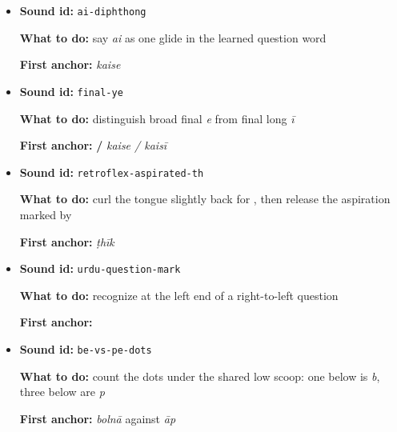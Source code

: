 \begin{itemize}
\begin{minipage}[t]{\linewidth}
  \par \textbf{First anchor:} \textbf{} \emph{kyā}
  \end{minipage}
  \item \begin{minipage}[t]{\linewidth}
  \textbf{Sound id:} \texttt{ai-diphthong}
  \par \textbf{What to do:} say \emph{ai} as one glide in the learned question word
  \par \textbf{First anchor:} \textbf{} \emph{kaise}
  \end{minipage}
  \item \begin{minipage}[t]{\linewidth}
  \textbf{Sound id:} \texttt{final-ye}
  \par \textbf{What to do:} distinguish broad final \textbf{} \emph{e} from final \textbf{} long \emph{ī}
  \par \textbf{First anchor:} \textbf{ / } \emph{kaise / kaisī}
  \end{minipage}
  \item \begin{minipage}[t]{\linewidth}
  \textbf{Sound id:} \texttt{retroflex-aspirated-th}
  \par \textbf{What to do:} curl the tongue slightly back for \textbf{}, then release the aspiration marked by \textbf{}
  \par \textbf{First anchor:} \textbf{} \emph{ṭhīk}
  \end{minipage}
  \item \begin{minipage}[t]{\linewidth}
  \textbf{Sound id:} \texttt{urdu-question-mark}
  \par \textbf{What to do:} recognize \textbf{} at the left end of a right-to-left question
  \par \textbf{First anchor:} \textbf{    }
  \end{minipage}
  \item \begin{minipage}[t]{\linewidth}
  \textbf{Sound id:} \texttt{be-vs-pe-dots}
  \par \textbf{What to do:} count the dots under the shared low scoop: one below is \textbf{} \emph{b}, three below are \textbf{} \emph{p}
  \par \textbf{First anchor:} \textbf{} \emph{bolnā} against \textbf{} \emph{āp}
  \end{minipage}

\end{itemize}

